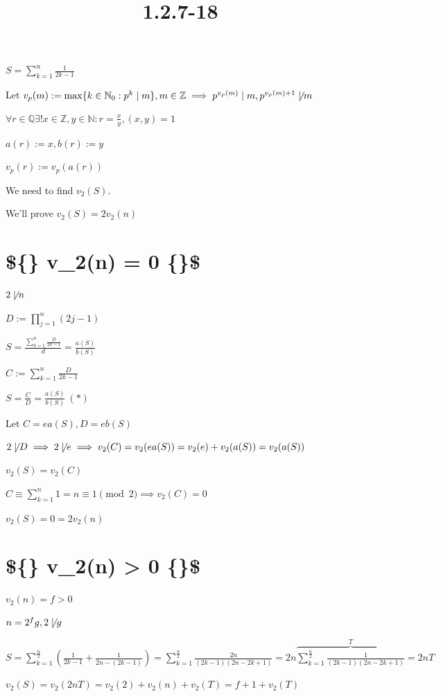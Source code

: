 \documentclass{article}
\title{1.2.7-18}
\begin{document}
\maketitle

$S = \sum_{k=1}^{n} \frac{1}{2k-1}$

Let $v_p(m) := \max \{ k \in \mathbb{N}_0: p^k \mid m \}, m \in \mathbb{Z} \implies p^{v_p(m)} \mid m, p^{v_p(m) + 1} \not\mid m$

$\forall r\in\mathbb{Q} \exists! x\in\mathbb{Z}, y\in\mathbb{N}: r = \frac{x}{y}, (x,y)=1$

$a(r) := x, b(r) := y$

$v_p(r) := v_p(a(r))$

We need to find $v_2(S)$.

We'll prove $v_2(S) = 2 v_2(n)$

\section*{\$\{\} v\_2(n) = 0 \{\}\$}

$2 \not\mid n$

$D := \prod_{j=1}^n (2j-1)$

$S = \frac{\sum_{k=1}^n \frac{D}{2k-1}}{d} = \frac{a(S)}{b(S)}$

$C := \sum_{k=1}^n \frac{D}{2k-1}$

$S = \frac{C}{D} = \frac{a(S)}{b(S)}\ (*)$

Let $C = ea(S), D = eb(S)$

$2 \not\mid D \implies 2 \not\mid e \implies v_2(C) = v_2(ea(S)) = v_2(e) + v_2(a(S)) = v_2(a(S))$

$v_2(S) = v_2(C)$

$C \equiv \sum_{k=1}^n 1 = n \equiv 1 \pmod 2 \implies v_2(C) = 0$

$v_2(S) = 0 = 2 v_2(n)$

\section*{\$\{\} v\_2(n) > 0 \{\}\$}

$v_2(n) = f > 0$

$n = 2^f g, 2 \not\mid g$

$S = \sum_{k=1}^{\frac{n}{2}}(\frac{1}{2k-1} + \frac{1}{2n-(2k-1)}) = \sum_{k=1}^{\frac{n}{2}}\frac{2n}{(2k-1)(2n-2k+1)} = 2n \overbrace{\sum_{k=1}^{\frac{n}{2}}\frac{1}{(2k-1)(2n-2k+1)}}^{T} = 2nT$

$v_2(S) = v_2(2nT) = v_2(2) + v_2(n) + v_2(T) = f + 1 + v_2(T)$
\end{document}
